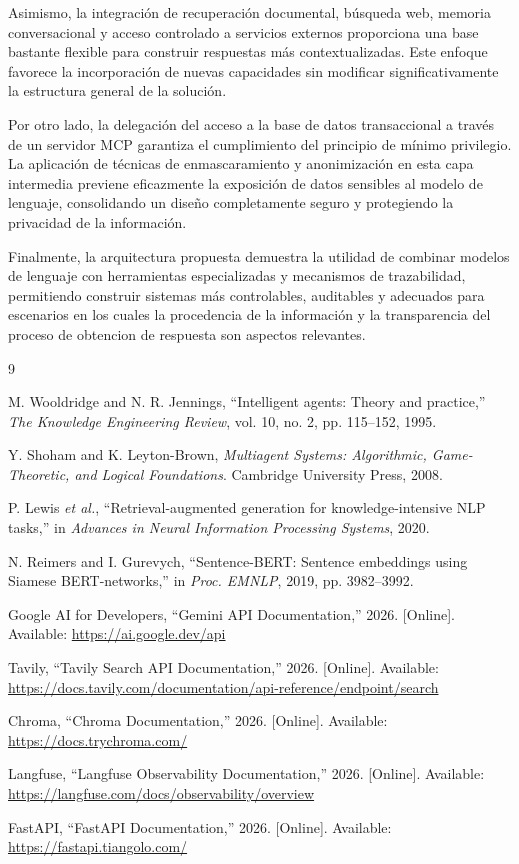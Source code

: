 \documentclass[conference]{IEEEtran}
\begin{document}
Asimismo, la integración de recuperación documental, búsqueda web, memoria conversacional y acceso controlado a servicios externos proporciona una base bastante flexible para construir respuestas más contextualizadas. Este enfoque favorece la incorporación de nuevas capacidades sin modificar significativamente la estructura general de la solución.

Por otro lado, la delegación del acceso a la base de datos transaccional a través de un servidor MCP garantiza el cumplimiento del principio de mínimo privilegio. La aplicación de técnicas de enmascaramiento y anonimización en esta capa intermedia previene eficazmente la exposición de datos sensibles al modelo de lenguaje, consolidando un diseño completamente seguro y protegiendo la privacidad de la información.

Finalmente, la arquitectura propuesta demuestra la utilidad de combinar modelos de lenguaje con herramientas especializadas y mecanismos de trazabilidad, permitiendo construir sistemas más controlables, auditables y adecuados para escenarios en los cuales la procedencia de la información y la transparencia del proceso de obtencion de respuesta son aspectos relevantes.

\begin{thebibliography}{9}

M. Wooldridge and N. R. Jennings, ``Intelligent agents: Theory and practice,'' \textit{The Knowledge Engineering Review}, vol. 10, no. 2, pp. 115--152, 1995.

Y. Shoham and K. Leyton-Brown, \textit{Multiagent Systems: Algorithmic, Game-Theoretic, and Logical Foundations}. Cambridge University Press, 2008.

P. Lewis \textit{et al.}, ``Retrieval-augmented generation for knowledge-intensive NLP tasks,'' in \textit{Advances in Neural Information Processing Systems}, 2020.

N. Reimers and I. Gurevych, ``Sentence-BERT: Sentence embeddings using Siamese BERT-networks,'' in \textit{Proc. EMNLP}, 2019, pp. 3982--3992.

Google AI for Developers, ``Gemini API Documentation,'' 2026. [Online]. Available: \url{https://ai.google.dev/api}

Tavily, ``Tavily Search API Documentation,'' 2026. [Online]. Available: \url{https://docs.tavily.com/documentation/api-reference/endpoint/search}

Chroma, ``Chroma Documentation,'' 2026. [Online]. Available: \url{https://docs.trychroma.com/}

Langfuse, ``Langfuse Observability Documentation,'' 2026. [Online]. Available: \url{https://langfuse.com/docs/observability/overview}

FastAPI, ``FastAPI Documentation,'' 2026. [Online]. Available: \url{https://fastapi.tiangolo.com/}

\end{thebibliography}
\end{document}

